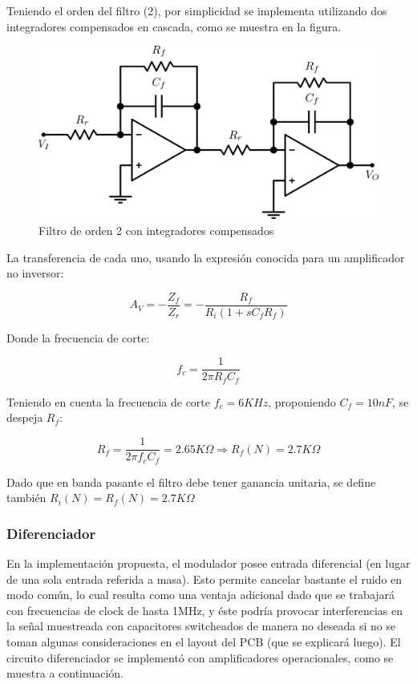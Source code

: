 \documentclass[assd_tp3_main.tex]{subfiles}
\begin{document}

Teniendo el orden del filtro (2), por simplicidad se implementa utilizando dos integradores compensados en cascada, como se muestra en la figura.

\begin{figure}[!ht]
\begin{centering}
\includegraphics[scale=0.5]{images/ej5/Filtro.png}
\par\end{centering}
\caption{Filtro de orden 2 con integradores compensados}
\end{figure}

La transferencia de cada uno, usando la expresión conocida para un amplificador no inversor:

\[
A_V = -\frac{Z_f}{Z_r} = -\frac{R_f}{R_i(1+sC_fR_f)}
\]

Donde la frecuencia de corte:

\[
f_c = \frac{1}{2 \pi R_f C_f}
\]

Teniendo en cuenta la frecuencia de corte $f_c = 6KHz$, proponiendo $C_f = 10nF$, se despeja $R_f$:

\[
R_f = \frac{1}{2 \pi f_c C_f} = 2.65K\Omega \Longrightarrow R_f(N) = 2.7K\Omega
\] 

Dado que en banda pasante el filtro debe tener ganancia unitaria, se define también $R_i(N) = R_f(N) = 2.7K\Omega$

\subsubsection{Diferenciador}

En la implementación propuesta, el modulador posee entrada diferencial (en lugar de una sola entrada referida a masa). Esto permite cancelar bastante el ruido en modo común, lo cual resulta como una ventaja adicional dado que se trabajará con frecuencias de clock de hasta 1MHz, y éste podría provocar interferencias en la señal muestreada con capacitores switcheados de manera no deseada si no se toman algunas consideraciones en el layout del PCB (que se explicará luego). El circuito diferenciador se implementó con amplificadores operacionales, como se muestra a continuación.
\end{document}
